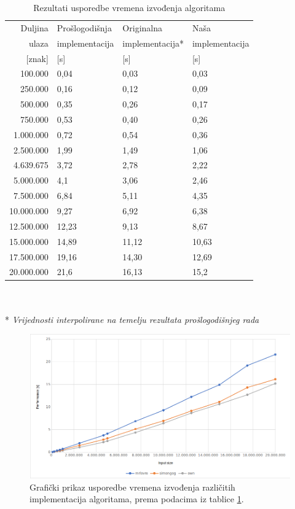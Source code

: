 \documentclass[a4paper,12pt]{article}
\begin{document}
\begin{table}[h!]
	\caption{Rezultati usporedbe vremena izvođenja algoritama}
	\label{tableTimeComp}
	\begin{center}
		\begin{tabular}{rlll}
			\toprule
			Duljina & Prošlogodišnja & Originalna & Naša \\
			ulaza & implementacija & implementacija* & implementacija \\
			{[znak]} & [s] & [s] & [s] \\
			\midrule
			100.000	   	& 	0,04 	&	0,03		&	0,03 \\
			250.000		& 	0,16	&	0,12		&	0,09 \\
			500.000		& 	0,35	&	0,26		&	0,17 \\
			750.000		& 	0,53	&	0,40		&	0,26 \\
			1.000.000	& 	0,72	&	0,54		&	0,36 \\
			2.500.000	& 	1,99	&	1,49		&	1,06 \\
			4.639.675	& 	3,72	&	2,78		&	2,22 \\
			5.000.000	& 	4,1		&	3,06		&	2,46 \\
			7.500.000	& 	6,84	&	5,11		&	4,35 \\
			10.000.000	& 	9,27	&	6,92		&	6,38 \\
			12.500.000	& 	12,23	&	9,13		&	8,67 \\
			15.000.000	& 	14,89	&	11,12		&	10,63 \\
			17.500.000	& 	19,16	&	14,30		&	12,69 \\
			20.000.000	& 	21,6	&	16,13		&	15,2 \\
			\bottomrule
		\end{tabular}\\ ~ \\
		* \textit{Vrijednosti interpolirane na temelju rezultata prošlogodišnjeg rada}
	\end{center}
\end{table}

\begin{figure}[h!]
	\begin{center}
		\includegraphics[width=\columnwidth]{timeGraph.png}
 		\caption{Grafički prikaz usporedbe vremena izvođenja različitih implementacija algoritama, prema podacima iz tablice \ref{tableTimeComp}.}
 		\label{fig:graphTime}
	\end{center}
\end{figure}
\end{document}
